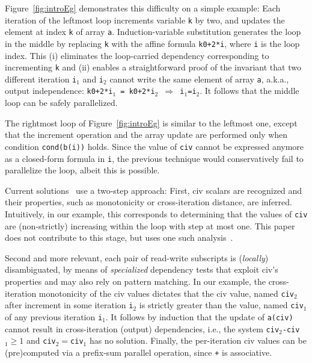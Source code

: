 \documentclass{sig-alternate}
\begin{document}
\enlargethispage{\baselineskip}

Figure~\ref{fig:introEg} demonstrates this difficulty on a
simple example:
%
Each iteration of the leftmost loop increments variable {\tt k} by two, and
updates the element at index {\tt k} of array {\tt a}. %
%
Induction-variable substitution generates the loop in the middle by replacing 
{\tt k} with the affine formula {\tt k0+2*i}, where {\tt i} is the 
loop index.   This (i) eliminates the loop-carried dependency corresponding to 
incrementing {\tt k} and (ii) enables a straightforward proof of the invariant
that two different iteration {\tt i$_1$} and {\tt i$_2$} cannot write the same
element of array {\tt a}, a.k.a., output independence: 
{\tt k0+2*i$_1$~=~k0+2*i$_2$ $\Rightarrow$ i$_1$=i$_2$}.
It follows that the middle loop can be safely parallelized.

The rightmost loop of Figure~\ref{fig:introEg} is similar to
the leftmost one, except that the increment operation and the 
array update are performed only when condition {\tt cond(b(i))} 
holds.  Since the value of {\tt civ} cannot be expressed anymore 
as a closed-form formula in {\tt i}, the previous technique would
conservatively fail to parallelize the loop, albeit this is possible.

Current solutions~\cite{Blume94RangeTest,SeqVars,PaduaStackArr,VEG,MonStmt,CohenBeyondMon} 
use a two-step approach:
First, {\sc civ} scalars are recognized and their properties, such as 
monotonicity or cross-iteration distance, are inferred.   
Intuitively, in our example, this corresponds to determining that 
the values of {\tt civ} are (non-strictly) increasing
within the loop with step at most one.
This paper does not contribute to this stage, but uses one 
such analysis~\cite{VEG}.

Second and more relevant, each pair of read-write subscripts is ({\em locally}) 
disambiguated, by means of {\em specialized} dependency tests that exploit
{\sc civ}'s properties and may also rely on pattern matching.
In our example, the cross-iteration monotonicity of the {\sc civ} values 
dictates that the {\sc civ} value, named {\tt civ$_2$} after increment 
in some iteration {\tt i$_2$} is strictly greater than the value,
named {\tt civ$_1$} of any previous iteration {\tt i$_1$}.
It follows by induction that the update of {\tt a(civ)}
cannot result in cross-iteration (output) dependencies, i.e.,
the system {\tt civ$_2$-civ$_1 \geq 1$} and {\tt civ$_2 = $civ$_1$}
has no solution. %
Finally, the per-iteration {\sc civ} values can be (pre)computed 
via a prefix-sum parallel operation, since {\tt +} is associative.
\end{document}

